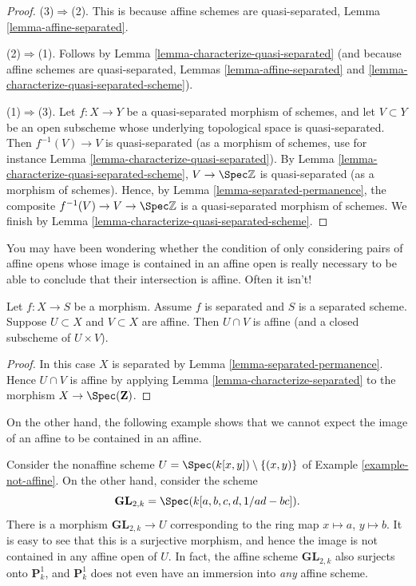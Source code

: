 \begin{proof}
(3)$\Rightarrow$(2).
This is because affine schemes are quasi-separated, Lemma \ref{lemma-affine-separated}.

\medskip\noindent
(2)$\Rightarrow$(1).
Follows by Lemma \ref{lemma-characterize-quasi-separated}
(and because affine schemes are quasi-separated,
Lemmas \ref{lemma-affine-separated} and
\ref{lemma-characterize-quasi-separated-scheme}).

\medskip\noindent
(1)$\Rightarrow$(3).
Let $f:X\to Y$ be a quasi-separated morphism of schemes, and let $V\subset Y$ be an open subscheme whose underlying topological space is quasi-separated. Then $f^{-1}(V)\to V$ is quasi-separated (as a morphism of schemes, use for instance Lemma \ref{lemma-characterize-quasi-separated}). By Lemma \ref{lemma-characterize-quasi-separated-scheme}, $V\to\Spec\mathbb{Z}$ is quasi-separated (as a morphism of schemes). Hence, by Lemma \ref{lemma-separated-permanence}, the composite $f^{-1}(V)\to V\to\Spec\mathbb{Z}$ is a quasi-separated morphism of schemes. We finish by Lemma \ref{lemma-characterize-quasi-separated-scheme}.
\end{proof}

\noindent
You may have been wondering whether the condition
of only considering pairs of affine opens whose image is contained
in an affine open is really necessary to be able to conclude
that their intersection is affine. Often it isn't!

\begin{lemma}
\label{lemma-curiosity}
Let $f : X \to S$ be a morphism.
Assume $f$ is separated and $S$ is a separated scheme.
Suppose $U \subset X$ and $V \subset X$ are affine.
Then $U \cap V$ is affine (and a closed subscheme of $U \times V$).
\end{lemma}

\begin{proof}
In this case $X$ is separated by Lemma \ref{lemma-separated-permanence}.
Hence $U \cap V$ is affine by
applying Lemma \ref{lemma-characterize-separated} to the
morphism $X \to \Spec(\mathbf{Z})$.
\end{proof}

\noindent
On the other hand, the following example shows that we cannot
expect the image of an affine to be contained in an affine.

\begin{example}
\label{example-image-affine-projective}
Consider the nonaffine scheme
$U = \Spec(k[x, y]) \setminus \{(x, y)\}$ of
Example \ref{example-not-affine}. On the other hand, consider the
scheme
$$
\mathbf{GL}_{2, k} = \Spec(k[a, b, c, d, 1/ad - bc]).
$$
There is a morphism $\mathbf{GL}_{2, k} \to U$ corresponding
to the ring map $x \mapsto a$, $y \mapsto b$. It is easy to see that
this is a surjective morphism, and hence the image is not contained
in any affine open of $U$. In fact, the affine scheme
$\mathbf{GL}_{2, k}$ also surjects onto $\mathbf{P}^1_k$, and
$\mathbf{P}^1_k$ does not even have an immersion into {\it any} affine scheme.
\end{example}

